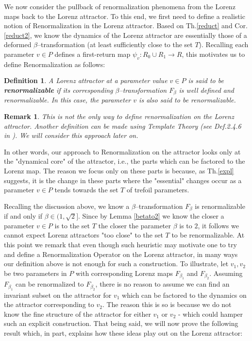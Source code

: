 \documentclass[10pt,reqno]{amsart}
\theoremstyle{plain}
\newtheorem{definition}{Definition}[section]
\theoremstyle{assumption}
\theoremstyle{notation}
\theoremstyle{claim}
\theoremstyle{conj}
\newtheorem{remark}{\textbf{Remark}}[section]
\theoremstyle{theorem}
\theoremstyle{proposition}
\theoremstyle{corollary}
\begin{document}
We now consider the pullback of renormalization phenomena from the Lorenz maps back to the Lorenz attractor. To this end, we first need to define a realistic notion of Renormalization in the Lorenz attractor. Based on Th.\ref{reduct} and Cor.\ref{reduct2}, we know the dynamics of the Lorenz attractor are essentially those of a deformed $\beta$--transformation (at least sufficiently close to the set $T$). Recalling each parameter $v\in P$ defines a first-return map $\psi_v:R_0\cup R_1\to R$, this motivates us to define Renormalization as follows:
\begin{definition}
\label{renormvector}    A Lorenz attractor at a parameter value $v\in P$ is said to be \textbf{renormalizable} if its corresponding $\beta$--transformation $F_\beta$ is well defined and renormalizable. In this case, the parameter $v$ is also said to be renormalizable.
\end{definition}
\begin{remark}
    This is not the only way to define renormalization on the Lorenz attractor. Another definition can be made using Template Theory (see Def.2.4.6 in \cite{KNOTBOOK}). We will consider this approach later on.
\end{remark}
In other words, our approach to Renormalization on the attractor looks only at the "dynamical core" of the attractor, i.e., the parts which can be factored to the Lorenz map. The reason we focus only on these parts is because, as Th.\ref{expl} suggests, it is the change in these parts where the "essential" changes occur as a parameter $v\in P$ tends towards the set $T$ of trefoil parameters.

Recalling the discussion above, we know a $\beta$--transformation $F_\beta$ is renormalizable if and only if $\beta\in(1,\sqrt{2}]$. Since by Lemma \ref{betato2} we know the closer a parameter $v\in P$ is to the set $T$ the closer the parameter $\beta$ is to $2$, it follows we cannot expect Lorenz attractors "too close" to the set $T$ to be renormalizable. At this point we remark that even though such heuristic may motivate one to try and define a Renormalization Operator on the Lorenz attractor, in many ways our definition above is not enough for such a construction. To illustrate, let $v_1,v_2$ be two parameters in $P$ with corresponding Lorenz maps $F_{\beta_1}$ and $F_{\beta_2}$. Assuming $F_{\beta_1}$ can be renormalized to $F_{\beta_2}$, there is no reason to assume we can find an invariant subset on the attractor for $v_1$ which can be factored to the dynamics on the attractor corresponding to $v_2$. The reason this is so is because we do not know the fine structure of the attractor for either $v_1$ or $v_2$ - which could hamper such an explicit construction. That being said, we will now prove the following result which, in part, explains how these ideas play out on the Lorenz attractor:
\end{document}
